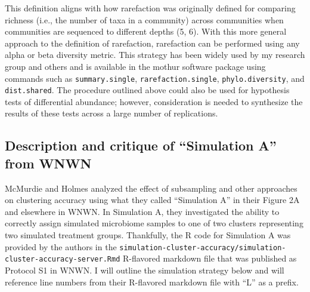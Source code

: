 \documentclass[
]{article}
\begin{document}
This definition aligns with how rarefaction was originally defined for
comparing richness (i.e., the number of taxa in a community) across
communities when communities are sequenced to different depths (5, 6).
With this more general approach to the definition of rarefaction,
rarefaction can be performed using any alpha or beta diversity metric.
This strategy has been widely used by my research group and others and
is available in the mothur software package using commands such as
\texttt{summary.single}, \texttt{rarefaction.single},
\texttt{phylo.diversity}, and \texttt{dist.shared}. The procedure
outlined above could also be used for hypothesis tests of differential
abundance; however, consideration is needed to synthesize the results of
these tests across a large number of replications.

\hypertarget{description-and-critique-of-simulation-a-from-wnwn}{%
\subsection{Description and critique of ``Simulation A'' from
WNWN}\label{description-and-critique-of-simulation-a-from-wnwn}}

McMurdie and Holmes analyzed the effect of subsampling and other
approaches on clustering accuracy using what they called ``Simulation
A'' in their Figure 2A and elsewhere in WNWN. In Simulation A, they
investigated the ability to correctly assign simulated microbiome
samples to one of two clusters representing two simulated treatment
groups. Thankfully, the R code for Simulation A was provided by the
authors in the
\texttt{simulation-cluster-accuracy/simulation-cluster-accuracy-server.Rmd}
R-flavored markdown file that was published as Protocol S1 in WNWN. I
will outline the simulation strategy below and will reference line
numbers from their R-flavored markdown file with ``L'' as a prefix.
\end{document}

